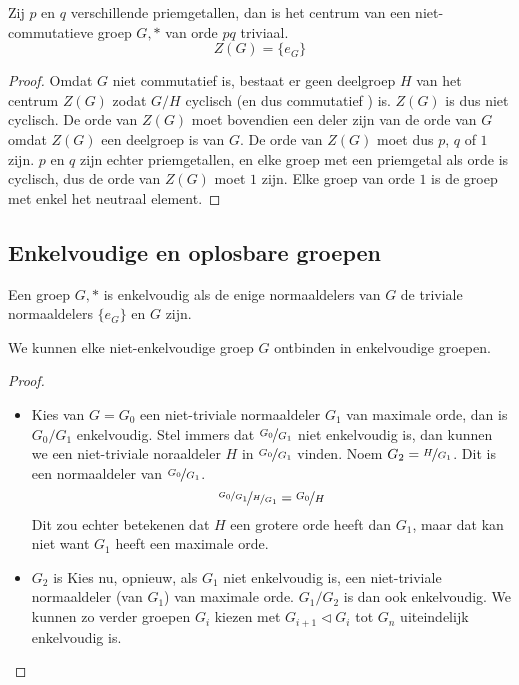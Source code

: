 \documentclass[main.tex]{subfiles}
\begin{document}
\begin{gev}
  Zij $p$ en $q$ verschillende priemgetallen, dan is het centrum van een niet-commutatieve groep $G,*$ van orde $pq$ triviaal.
  \[ Z(G) = \{ e_{G} \} \]

  \begin{proof}
    Omdat $G$ niet commutatief is, bestaat er geen deelgroep $H$ van het centrum $Z(G)$ zodat $G/H$ cyclisch (en dus commutatief ) is.
    $Z(G)$ is dus niet cyclisch.
    De orde van $Z(G)$ moet bovendien een deler zijn van de orde van $G$ omdat $Z(G)$ een deelgroep is van $G$. 
    De orde van $Z(G)$ moet dus $p$, $q$ of $1$ zijn. $p$ en $q$ zijn echter priemgetallen, en elke groep met een priemgetal als orde is cyclisch, dus de orde van $Z(G)$ moet $1$ zijn.
    Elke groep van orde $1$ is de groep met enkel het neutraal element.
  \end{proof}
\end{gev}

\subsection{Enkelvoudige en oplosbare groepen}
\label{sec:enkelv-en-oplosb}

\begin{de}
  Een groep $G,*$ is enkelvoudig als de enige normaaldelers van $G$ de triviale normaaldelers $\{e_{G}\}$ en $G$ zijn.
\end{de}

\begin{st}
  We kunnen elke niet-enkelvoudige groep $G$ ontbinden in enkelvoudige groepen.
  \begin{proof}
    \begin{itemize}
    \item Kies van $G=G_{0}$ een niet-triviale normaaldeler $G_{1}$ van maximale orde, dan is $G_{0}/G_{1}$ enkelvoudig.
      Stel immers dat $\nicefrac{G_{0}}{G_{1}}$ niet enkelvoudig is, dan kunnen we  een niet-triviale noraaldeler $H$ in $\nicefrac{G_{0}}{G_{1}}$ vinden.
      Noem $G_{2}= \nicefrac{H}{G_{1}}$. Dit is een normaaldeler van $\nicefrac{G_{0}}{G_{1}}$. 
      \[ \nicefrac{\nicefrac{G_{0}}{G_{1}}}{\nicefrac{H}{G_{1}}} = \nicefrac{G_{0}}{H} \]
      Dit zou echter betekenen dat $H$ een grotere orde heeft dan $G_{1}$, maar dat kan niet want $G_{1}$ heeft een maximale orde.
    \item $G_{2}$ is Kies nu, opnieuw, als $G_{1}$ niet enkelvoudig is, een niet-triviale normaaldeler (van $G_{1}$) van maximale orde.
      $G_{1}/G_{2}$ is dan ook enkelvoudig.
      We kunnen zo verder groepen $G_{i}$ kiezen met $G_{i+1} \triangleleft G_{i}$ tot $G_{n}$ uiteindelijk enkelvoudig is.
    \end{itemize}
  \end{proof}
\end{st}
\end{document}
